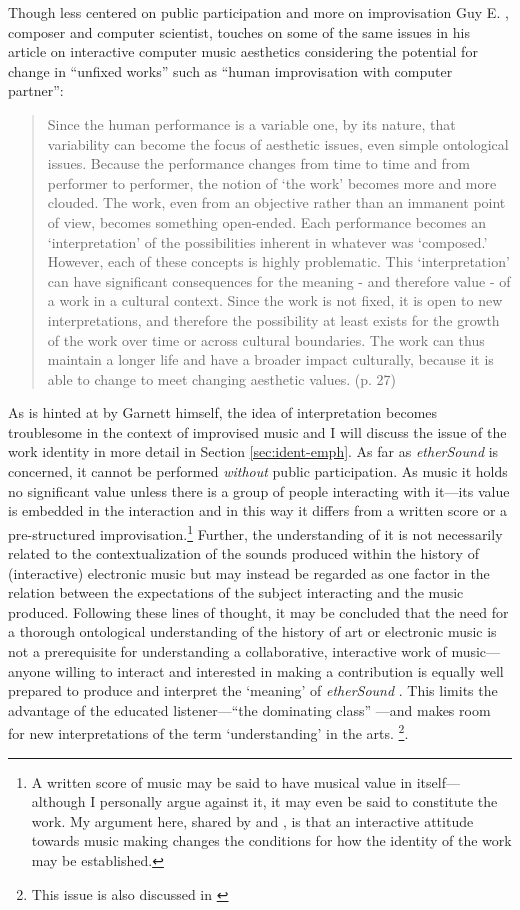 Though less centered on public participation and more on improvisation Guy E. \citet{Garnett}, composer and computer scientist, touches on some of the same issues in his article on interactive computer music aesthetics considering the potential for change in ``unfixed works'' such as ``human improvisation with computer partner'': 
\begin{quote}   
Since the human performance is a variable one, by its nature, that  variability can become the focus of aesthetic issues, even simple  ontological issues. Because the performance changes from time to  time and from performer to performer, the notion of `the work'  becomes more and more clouded. The work, even from an objective  rather than an immanent point of view, becomes something open-ended.  Each performance becomes an `interpretation' of the possibilities  inherent in whatever was `composed.' However, each of these concepts  is highly problematic. This `interpretation' can have significant  consequences for the meaning - and therefore value - of a work in a  cultural context. Since the work is not fixed, it is open to new  interpretations, and therefore the possibility at least exists for  the growth of the work over time or across cultural boundaries. The  work can thus maintain a longer life and have a broader impact  culturally, because it is able to change to meet changing aesthetic  values. (p. 27) 
\end{quote} 
As is hinted at by Garnett himself, the idea of interpretation becomes troublesome in the context of improvised music and I will discuss the issue of the work identity in more detail in Section \ref{sec:ident-emph}. As far as \emph{etherSound} is concerned, it cannot be performed \emph{without} public participation. As music it holds no significant value unless there is a group of people interacting with it---its value is embedded in the interaction and in this way it differs from a written score or a pre-structured improvisation.\footnote{A written score of music may be said to have   musical value in itself---although I personally argue against it, it   may even be said to constitute the work. My argument here, shared by   \citeauthor{Ascott} and \citeauthor{Garnett}, is that an interactive   attitude towards music making changes the conditions for how the   identity of the work may be established.}  Further, the understanding of it is not necessarily related to the contextualization of the sounds produced within the history of (interactive) electronic music but may instead be regarded as one factor in the relation between the expectations of the subject interacting and the music produced.  Following these lines of thought, it may be concluded that the need for a thorough ontological understanding of the history of art or electronic music is not a prerequisite for understanding a collaborative, interactive work of music---anyone willing to interact and interested in making a contribution is equally well prepared to produce and interpret the `meaning' of \emph{etherSound} . This limits the advantage of the educated listener---``the dominating class'' \citep{bourdieu}---and makes room for new interpretations of the term `understanding' in the arts. \footnote{This issue is also discussed in \citealp{frisk05}}. 


